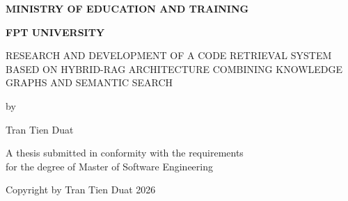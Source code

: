 \documentclass[12pt,letterpaper,oneside]{report}
\newcommand{\thesistitletext}{RESEARCH AND DEVELOPMENT OF A CODE RETRIEVAL SYSTEM BASED ON HYBRID-RAG ARCHITECTURE COMBINING KNOWLEDGE GRAPHS AND SEMANTIC SEARCH}
\newenvironment{physicalcenter}{%
    \par\noindent\hspace*{-18pt}\begin{minipage}[t]{\textwidth}\centering
}{%
    \end{minipage}\par
}
\begin{document}
\pagestyle{empty}

\begin{titlepage}
    \thispagestyle{empty}
    \begin{physicalcenter}\sffamily
        {\bfseries\fontsize{15}{18}\selectfont MINISTRY OF EDUCATION AND TRAINING\par}
        {\bfseries\fontsize{15}{18}\selectfont FPT UNIVERSITY\par}
        \vspace{72pt}
        \begin{singlespace}
            {\fontsize{15}{18}\selectfont \thesistitletext\par}
        \end{singlespace}
        \vspace{71pt}
        {\fontsize{12}{14.4}\selectfont by\par}
        \vspace{78pt}
        {\fontsize{12}{14.4}\selectfont Tran Tien Duat\par}
        \vspace{88pt}
        {\fontsize{12}{14.4}\selectfont
        A thesis submitted in conformity with the requirements\\
        for the degree of Master of Software Engineering\par}
        \vspace{136pt}
        {\fontsize{12}{14.4}\selectfont \textcopyright{} Copyright by Tran Tien Duat 2026\par}
    \end{physicalcenter}
\end{titlepage}
\end{document}
